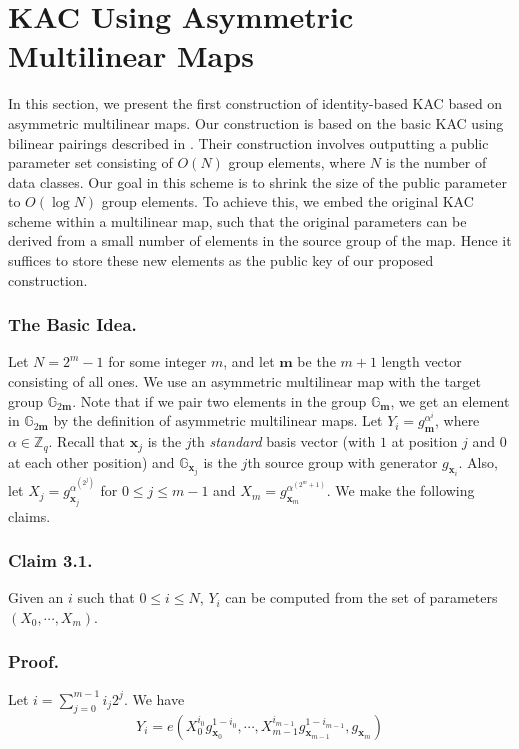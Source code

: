 \section{KAC Using Asymmetric Multilinear Maps}
\label{sec:proposal1}

In this section, we present the first construction of identity-based KAC based on asymmetric multilinear maps. Our construction is based on the basic KAC using bilinear pairings described in \cite{patranabis2015dynamic}. Their construction involves outputting a public parameter set consisting of $O(N)$ group elements, where $N$ is the number of data classes. Our goal in this scheme is to shrink the size of the public parameter to $O(\log N)$ group elements. To achieve this, we embed the original KAC scheme within a multilinear map, such that the original parameters can be derived from a small number of elements in the source group of the map. Hence it suffices to store these new elements as the public key of our proposed construction.

\subsubsection{The Basic Idea.} Let $N=2^m-1$ for some integer $m$, and let $\mathbf{m}$ be the $m+1$ length vector consisting of all ones. We use an asymmetric multilinear map with the target group $\mathbb{G}_{2\mathbf{m}}$. Note that if we pair two elements in the group $\mathbb{G}_{\mathbf{m}}$, we get an element in $\mathbb{G}_{2\mathbf{m}}$ by the definition of asymmetric multilinear maps. Let $Y_i=g^{\alpha^i}_{\mathbf{m}}$, where $\alpha\in\mathbb{Z}_q$. Recall that $\mathbf{x}_j$ is the $j$th \emph{standard} basis vector (with $1$ at position $j$ and $0$ at each other position) and $\mathbb{G}_{\mathbf{x}_j}$ is the $j$th source group with generator $g_{\mathbf{x}_i}$. Also, let $X_j=g^{\alpha^{(2^j)}}_{\mathbf{x}_j}$ for $0\leq j\leq m-1$ and $X_m=g^{\alpha^{(2^m+1)}}_{\mathbf{x}_m}$. We make the following claims.

\subsubsection{Claim 3.1.} Given an $i$ such that $0\leq i\leq N$, $Y_i$ can be computed from the set of parameters $(X_0,\cdots,X_m)$.
\subsubsection{Proof.} Let $i=\sum_{j=0}^{m-1}i_j2^j$. We have 
\begin{equation}
 Y_i=e(X^{i_0}_0g^{1-i_0}_{\mathbf{x}_0},\cdots,X^{i_{m-1}}_{m-1}g^{1-i_{m-1}}_{\mathbf{x}_{m-1}},g_{\mathbf{x}_m})\nonumber
\end{equation}
